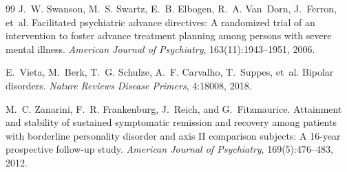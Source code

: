 \documentclass[11pt]{article}
\theoremstyle{definition}
\theoremstyle{remark}
\begin{document}
\begin{thebibliography}{99}
J.~W. Swanson, M.~S. Swartz, E.~B. Elbogen, R.~A. Van~Dorn, J.~Ferron, et~al.
\newblock Facilitated psychiatric advance directives: A randomized trial of an intervention to foster advance treatment planning among persons with severe mental illness.
\newblock \emph{American Journal of Psychiatry}, 163(11):1943--1951, 2006.

E.~Vieta, M.~Berk, T.~G. Schulze, A.~F. Carvalho, T.~Suppes, et~al.
\newblock Bipolar disorders.
\newblock \emph{Nature Reviews Disease Primers}, 4:18008, 2018.

M.~C. Zanarini, F.~R. Frankenburg, J.~Reich, and G.~Fitzmaurice.
\newblock Attainment and stability of sustained symptomatic remission and recovery among patients with borderline personality disorder and axis {II} comparison subjects: A 16-year prospective follow-up study.
\newblock \emph{American Journal of Psychiatry}, 169(5):476--483, 2012.

\end{thebibliography}
\end{document}
